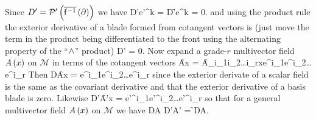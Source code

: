 Since $D' = {\mathcal{P}'}\left ( {{\overline{\mathsf{f}^{-1}}}\left ( {\partial} \right )} \right )$ we have
\be
	D'\W e'^{k} = D'\W\f{}{e^{k}} = 0.
\ee
and using the product rule the exterior derivative of a blade formed from cotangent vectors is
(just move the term in the product being differentiated to the front using the alternating property
of the ``$\wedge$'' product)
\be\label{eq5_125}
	D'\W {} = 0.
\ee
Now expand a grade-$r$ multivector field ${A}\left ( {x} \right )$ on $\mathcal{M}$ in terms of the cotangent vectors
\be
	\f{A}{x} = \f{A_{i_{1}i_{2}\dots i_{r}}}{x}e^{i_{1}}\W e^{i_{2}}\W\dots\W e^{i_{r}}
\ee
Then
\be
	D\W\f{A}{x} = \W e^{i_{1}}\W e^{i_{2}}\W\dots\W e^{i_{r}}
\ee
since the exterior derivate of a scalar field is the same as the covariant derivative and that the exterior
derivative of a basis blade is zero. Likewise
\be
	D'\W\f{A'}{x} = \W e'^{i_{1}}\W e'^{i_{2}}\W\dots\W e'^{i_{r}}
\ee
so that for a general multivector field ${A}\left ( {x} \right )$ on $\mathcal{M}$ we have
\be
	D\W A \mapsto D'\W A' = \f{}{D\W A}.
\ee
